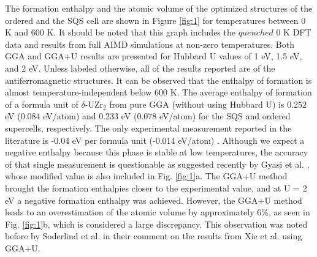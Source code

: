 \documentclass[preprint,12pt]{elsarticle}
\begin{document}
The formation enthalpy and the atomic volume of the optimized structures of the ordered and the SQS cell are shown in Figure \ref{fig:1} for temperatures between 0 K and 600 K. It should be noted that this graph includes the $quenched$ 0 K DFT data and results from full AIMD simulations at non-zero temperatures. Both GGA and GGA+U results are presented for Hubbard U values of 1 eV, 1.5 eV, and 2 eV. Unless labeled otherwise, all of the results reported are of the antiferromagnetic structures. It can be observed that the enthalpy of formation is almost temperature-independent below 600 K. The average enthalpy of formation of a formula unit of $\delta$-UZr$_2$ from pure GGA (without using Hubbard U) is 0.252 eV (0.084 eV/atom) and 0.233 eV (0.078 eV/atom) for the SQS and ordered supercells, respectively. The only experimental measurement reported in the literature is -0.04 eV per formula unit (-0.014 eV/atom) \cite{nagarajan_enthalpy_1993}. Although we expect a negative enthalpy because this phase is stable at low temperatures, the accuracy of that single measurement is questionable as suggested recently by Gyasi et al. \cite{gyasi_about_2022}, whose modified value is also included in Fig. \ref{fig:1}a. The GGA+U method brought the formation enthalpies closer to the experimental value, and at U = 2 eV a negative formation enthalpy was achieved. However, the GGA+U method leads to an overestimation of the atomic volume by approximately 6\%, as seen in Fig. \ref{fig:1}b, which is considered a large discrepancy. This observation was noted before by Soderlind et al. \cite{soderlind_comment_2014} in their comment on the results from Xie et al. \cite{xie_correlation_2013} using GGA+U.
\end{document}
